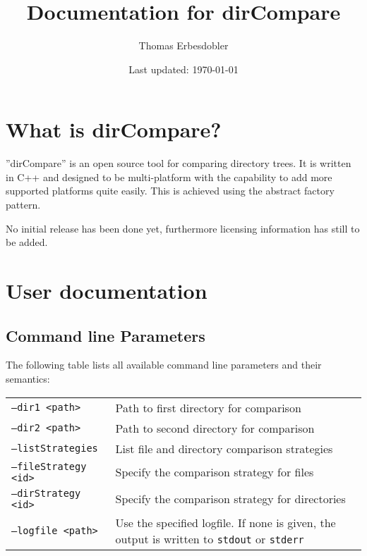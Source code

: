 \documentclass[a4paper]{article}
\title{Documentation for dirCompare}
\author{Thomas Erbesdobler}
\date{Last updated: \today}
\begin{document}
	\maketitle
	\tableofcontents
	
	\section{What is dirCompare?}
	\label{sec:what_is_dircompare}
	
	''dirCompare'' is an open source tool for comparing directory trees. It is written in C++ and designed to be multi-platform with the capability to add more supported platforms quite easily. This is achieved using the abstract factory pattern.
	
	No initial release has been done yet, furthermore licensing information has still to be added.
	
	\section{User documentation}
	\label{sec:user_documentation}
	
	\subsection{Command line Parameters}
	\label{subsec:command_line_parameters}
	
	The following table lists all available command line parameters and their semantics:
	
	\noindent
	\begin{tabularx}{\linewidth}{l|X}
		\texttt{--dir1 \textless path\textgreater} & Path to first directory for comparison \\
		\texttt{--dir2 \textless path\textgreater} & Path to second directory for comparison \\
		\texttt{--listStrategies} & List file and directory comparison strategies \\
		\texttt{--fileStrategy \textless id\textgreater} & Specify the comparison strategy for files \\
		\texttt{--dirStrategy \textless id\textgreater} & Specify the comparison strategy for directories \\
		\texttt{--logfile \textless path\textgreater} & Use the specified logfile. If none is given, the output is written to \texttt{stdout} or \texttt{stderr} \\
	\end{tabularx}
	
\end{document}
